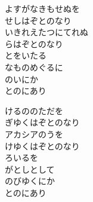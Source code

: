 \documentclass[10pt,b5j]{tarticle} %
\begin{document}
\vspace{1.5em} %
\newcommand{\linespace}{0.5em} %
\newcommand{\blocksize}{0.5\hsize} %
\begin{enumerate} %
    \begin{minipage}[c]{\blocksize}
    
        \vspace{\linespace}
        \item
        よすがなきもせぬを\\
        せしはぞとのなり\\
        いきれえたつにてれぬ\\
        らはぞとのなり\\
        とをいたる\\
        なものめぐるに\\
        のいにか\\
        とのにあり
        
        \vspace{\linespace}
        \item
        けるののただを\\
        ぎゆくはぞとのなり\\
        アカシアのうを\\
        けゆくはぞとのなり\\
        ろいるを\\
        がとしとして\\
        のびゆくにか\\
        とのにあり
        

\end{minipage}
\end{enumerate}
\end{document}
